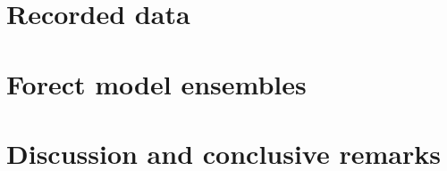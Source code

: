 

\section{Recorded data}

\section{Forect model ensembles}

\section{Discussion and conclusive remarks}


